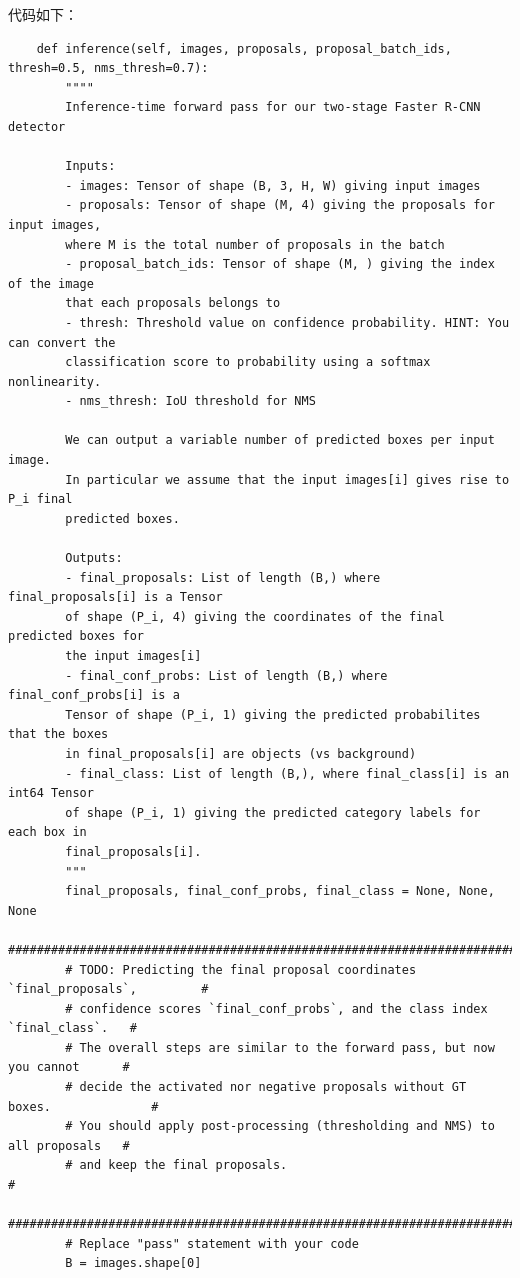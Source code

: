 \documentclass{article}%
\begin{document}
代码如下：
\begin{lstlisting}
    def inference(self, images, proposals, proposal_batch_ids, thresh=0.5, nms_thresh=0.7):
        """"
        Inference-time forward pass for our two-stage Faster R-CNN detector

        Inputs:
        - images: Tensor of shape (B, 3, H, W) giving input images
        - proposals: Tensor of shape (M, 4) giving the proposals for input images, 
        where M is the total number of proposals in the batch
        - proposal_batch_ids: Tensor of shape (M, ) giving the index of the image 
        that each proposals belongs to
        - thresh: Threshold value on confidence probability. HINT: You can convert the
        classification score to probability using a softmax nonlinearity.
        - nms_thresh: IoU threshold for NMS

        We can output a variable number of predicted boxes per input image.
        In particular we assume that the input images[i] gives rise to P_i final
        predicted boxes.

        Outputs:
        - final_proposals: List of length (B,) where final_proposals[i] is a Tensor
        of shape (P_i, 4) giving the coordinates of the final predicted boxes for
        the input images[i]
        - final_conf_probs: List of length (B,) where final_conf_probs[i] is a
        Tensor of shape (P_i, 1) giving the predicted probabilites that the boxes
        in final_proposals[i] are objects (vs background)
        - final_class: List of length (B,), where final_class[i] is an int64 Tensor
        of shape (P_i, 1) giving the predicted category labels for each box in
        final_proposals[i].
        """
        final_proposals, final_conf_probs, final_class = None, None, None
        ##############################################################################
        # TODO: Predicting the final proposal coordinates `final_proposals`,         #
        # confidence scores `final_conf_probs`, and the class index `final_class`.   #
        # The overall steps are similar to the forward pass, but now you cannot      #
        # decide the activated nor negative proposals without GT boxes.              #
        # You should apply post-processing (thresholding and NMS) to all proposals   #
        # and keep the final proposals.                                               #
        ##############################################################################
        # Replace "pass" statement with your code
        B = images.shape[0]


\end{lstlisting}
\end{document}
